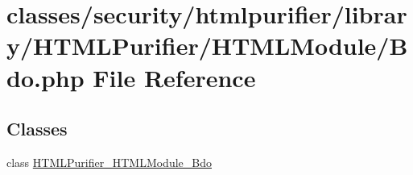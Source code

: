 \hypertarget{Bdo_8php}{\section{classes/security/htmlpurifier/library/\+H\+T\+M\+L\+Purifier/\+H\+T\+M\+L\+Module/\+Bdo.php File Reference}
\label{Bdo_8php}
}
\subsection*{Classes}
\begin{DoxyCompactItemize}
\item 
class \hyperlink{classHTMLPurifier__HTMLModule__Bdo}{H\+T\+M\+L\+Purifier\+\_\+\+H\+T\+M\+L\+Module\+\_\+\+Bdo}
\end{DoxyCompactItemize}

